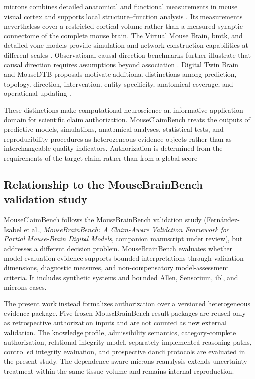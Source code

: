 \documentclass[11pt,a4paper]{article}
\newcommand{\MouseBrainBenchCompanion}{Fern\'andez-Isabel et al., \emph{MouseBrainBench: A Claim-Aware Validation Framework for Partial Mouse-Brain Digital Models}, companion manuscript under review}
\begin{document}
\ac{microns} combines detailed anatomical and functional measurements in
mouse visual cortex and supports local structure--function analysis
\citep{bae2025microns,ding2025wiring}. Its measurements nevertheless cover
a restricted cortical volume rather than a measured synaptic connectome of the
complete mouse brain. The Virtual Mouse Brain, \ac{bmtk}, and detailed
\ac{vone} models provide simulation and network-construction capabilities at
different scales
\citep{melozzi2017virtualmouse,dai2020bmtk,billeh2020v1}.
Observational causal-direction benchmarks further illustrate that causal
direction requires assumptions beyond association \citep{mooij2016cause}.
Digital Twin Brain and MouseDTB proposals motivate additional distinctions
among prediction, topology, direction, intervention, entity specificity,
anatomical coverage, and operational updating
\citep{xiong2023dtb,chen2026mousedtb}.

These distinctions make computational neuroscience an informative
application domain for scientific claim authorization. MouseClaimBench treats
the outputs of predictive models, simulations, anatomical analyses, statistical
tests, and reproducibility procedures as heterogeneous evidence objects rather
than as interchangeable quality indicators. Authorization is determined from
the requirements of the target claim rather than from a global score.


\subsection{Relationship to the MouseBrainBench validation study}
\label{subsec:mousebrainbench-relationship}

MouseClaimBench follows the MouseBrainBench validation study
(\MouseBrainBenchCompanion), but addresses a different
decision problem. MouseBrainBench evaluates whether model-evaluation
evidence supports bounded interpretations through validation dimensions,
diagnostic measures, and non-compensatory model-assessment criteria. It
includes synthetic systems and bounded Allen, Sensorium, \ac{ibl}, and
\ac{microns} cases.

The present work instead formalizes authorization over a versioned
heterogeneous evidence package. Five frozen MouseBrainBench result packages
are reused only as retrospective authorization inputs and are not counted as
new external validation. The knowledge profile, admissibility semantics,
category-complete authorization, relational integrity model, separately
implemented reasoning paths, controlled integrity evaluation, and prospective
\ac{dandi} protocols are evaluated in the present study. The
dependence-aware \ac{microns} reanalysis extends uncertainty treatment within
the same tissue volume and remains internal reproduction.
\end{document}
